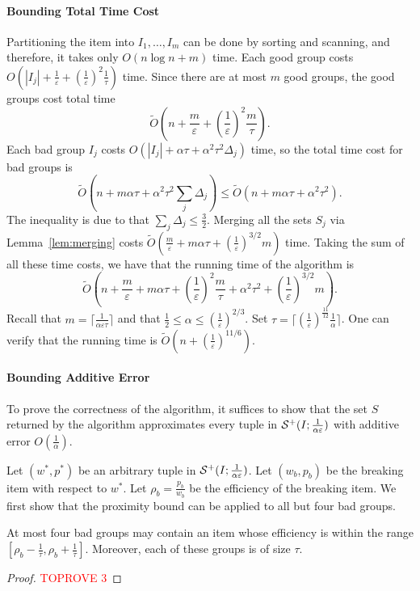\documentclass[a4paper,UKenglish,cleveref, autoref, thm-restate, pdfa]{lipics-v2021}
\newcommand{\eps}{\varepsilon}
\renewcommand{\leq}{\leqslant}
\begin{document}
\paragraph*{Bounding Total Time Cost}
Partitioning the item into $I_1, \ldots, I_m$ can be done by sorting and scanning, and therefore, it takes only $O(n\log n + m)$ time. Each good group costs $O(|I_j| + \frac{1}{\eps} + (\frac{1}{\eps})^2\frac{1}{\tau})$ time. Since there are at most $m$ good groups, the good groups cost  total time
\[
    \tilde{O}\left(n + \frac{m}{\eps} + (\frac{1}{\eps})^2\frac{m}{\tau}\right).
\]
Each bad group $I_j$ costs $O(|I_j| + \alpha\tau + \alpha^2\tau^2\Delta_j)$ time, so the total time cost for bad groups is
\[
    \tilde{O}(n + m\alpha\tau + \alpha^2\tau^2\sum_j\Delta_j) \leq \tilde{O}(n + m\alpha\tau + \alpha^2\tau^2).
\]
The inequality is due to that $\sum_j\Delta_j \leq \frac{3}{2}$. Merging all the sets $S_j$ via Lemma~\ref{lem:merging} costs $\tilde{O}(\frac{m}{\eps} + m\alpha\tau + (\frac{1}{\eps})^{3/2}m)$ time. Taking the sum of all these time costs, we have that the running time of the algorithm is
\[
    \tilde{O}\left(n  + \frac{m}{\eps} + m\alpha\tau + (\frac{1}{\eps})^2\frac{m}{\tau} + \alpha^2\tau^2 + (\frac{1}{\eps})^{3/2}m\right).
\]
Recall that $m = \lceil \frac{1}{\alpha\eps\tau} \rceil$ and that $\frac{1}{2} \leq \alpha \leq (\frac{1}{\eps})^{2/3}$. Set $\tau = \lceil(\frac{1}{\eps})^\frac{11}{12}\frac{1}{\alpha}\rceil$. One can verify that the running time is $\tilde{O}(n + (\frac{1}{\eps})^{11/6})$.

\paragraph*{Bounding Additive Error}
To prove the correctness of the algorithm, it suffices to show that the set $S$ returned by the algorithm approximates every tuple in ${\cal S}^+(I; \frac{1}{\alpha\eps})$ with additive error $O(\frac{1}{\alpha})$. 

Let $(w^*, p^*)$ be an arbitrary tuple in ${\cal S}^+(I; \frac{1}{\alpha\eps})$.  Let $(w_b, p_b)$ be the breaking item with respect to $w^*$. Let $\rho_b = \frac{p_b}{w_b}$ be the efficiency of the breaking item. We first show that the proximity bound can be applied to all but four bad groups.

\begin{lemma}\label{lem:bound-median}
    At most four bad groups may contain an item whose efficiency is within the range $[\rho_b - \frac{1}{\tau}, \rho_b + \frac{1}{\tau}]$. Moreover, each of these groups is of size $\tau$.
\end{lemma}
\begin{proof}\textcolor{red}{TOPROVE 3}\end{proof}
\end{document}
